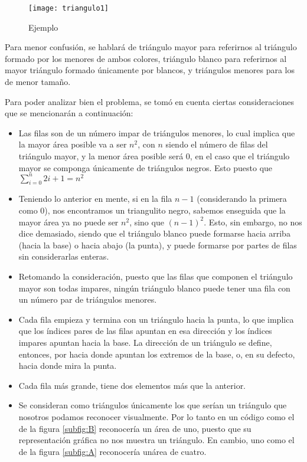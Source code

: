 \documentclass[letterpaper]{article}
\begin{document}
    \begin{figure}[h!]
      \centering
      \texttt{[image: triangulo1]}
      \caption{Ejemplo}
    \end{figure}

  Para menor confusi\'on, se hablar\'a de tri\'angulo mayor para
  referirnos al tri\'angulo formado por los menores de ambos colores, tri\'angulo
  blanco para referirnos al mayor tri\'angulo formado \'unicamente por blancos, y
  tri\'angulos menores para los de menor tamaño.\par

  Para poder analizar bien el problema, se tom\'o en cuenta ciertas
  consideraciones que se mencionar\'an a continuaci\'on:
    \begin{itemize}
    \item Las filas son de un n\'umero impar de tri\'angulos menores,
    lo cual implica que la mayor \'area posible va a ser \(n^2\), con \(n\) siendo el
    n\'umero de filas del tri\'angulo mayor, y la menor \'area posible ser\'a 0,
    en el caso que el tri\'angulo mayor se componga \'unicamente de tri\'angulos
    negros. Esto puesto que $\sum_{i=0}^{n} 2{i}+1 = {n}^2$
    \item Teniendo lo anterior en mente, si en la fila \(n-1\) (considerando la
    primera como 0), nos encontramos un triangulito negro, sabemos enseguida
    que la mayor \'area ya no puede ser \({n}^2\), sino que \({(n-1)}^2\). Esto, sin embargo,
    no nos dice demasiado, siendo que el tri\'angulo blanco puede formarse hacia
    arriba (hacia la base) o hacia abajo (la punta), y puede formarse por
    partes de filas sin considerarlas enteras.
    \item Retomando la consideraci\'on, puesto que las filas que componen el
    tri\'angulo mayor son todas impares, ning\'un tri\'angulo blanco puede tener
    una fila con un n\'umero par de tri\'angulos menores.
    \item Cada fila empieza y termina con un tri\'angulo hacia la punta, lo que
    implica que los \'indices pares de las filas apuntan en esa direcci\'on y
    los \'indices impares apuntan hacia la base. La direcci\'on de un tri\'angulo
    se define, entonces, por hacia donde apuntan los extremos de la base, o,
    en su defecto, hacia donde mira la punta.
    \item Cada fila m\'as grande, tiene dos elementos m\'as que la
    anterior.
    \item Se consideran como tri\'angulos \'unicamente los que ser\'ian un
    tri\'angulo que nosotros podamos reconocer visualmente. Por
    lo tanto en un c\'odigo como el de la figura \ref{subfig:B} reconocer\'ia un
    \'area de uno, puesto que su representaci\'on gr\'afica no nos
    muestra un tri\'angulo. En cambio, uno como el de la figura \ref{subfig:A} reconocer\'ia un\'area de cuatro.
    \end{itemize}
\end{document}
